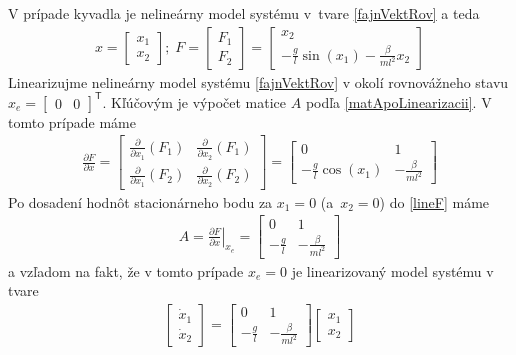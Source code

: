 \documentclass[a4paper, 10pt, ]{article}
\begin{document}
V prípade kyvadla je nelineárny model systému v~tvare \eqref{fajnVektRov} a teda
\begin{align}
	x=
	\begin{bmatrix}
		{x}_1 \\ {x}_2
	\end{bmatrix}
	;
	\;
	F=
	\begin{bmatrix}
		F_1 \\ F_2
	\end{bmatrix}
	=
	\begin{bmatrix}
		x_2 \\ - \frac{g}{l} \sin(x_1) - \frac{\beta}{ml^2} x_2
	\end{bmatrix}
\end{align}
Linearizujme nelineárny model systému \eqref{fajnVektRov} v okolí rovnovážneho stavu $x_e = \begin{bmatrix} 0 & 0 \end{bmatrix}^\mathsf{T}$. Kľúčovým je výpočet matice $A$ podľa \eqref{matApoLinearizacii}. V tomto prípade máme
\begin{align} \label{lineF}
	\frac{\partial F}{\partial x}
	=
	\begin{bmatrix}
		\displaystyle\frac{\partial}{\partial x_1} \left( F_1 \right) & \displaystyle\frac{\partial}{\partial x_2} \left( F_1 \right) \\
		\displaystyle\frac{\partial}{\partial x_1} \left( F_2 \right) & \displaystyle\frac{\partial}{\partial x_2} \left( F_2 \right)
	\end{bmatrix}
	=
	\begin{bmatrix}
		0 & 1 \\
		- \displaystyle\frac{g}{l} \cos(x_1) & - \displaystyle\frac{\beta}{ml^2}
	\end{bmatrix}
\end{align}
Po dosadení hodnôt stacionárneho bodu za $x_1 = 0$ (a~$x_2 = 0$) do \eqref{lineF} máme
\begin{align}
	A = \left. \frac{\partial F}{\partial x} \right|_{x_e}
	=
	\begin{bmatrix}
		0 & 1 \\
		- \displaystyle\frac{g}{l}  & - \displaystyle\frac{\beta}{ml^2}
	\end{bmatrix}
\end{align}
a vzľadom na fakt, že v tomto prípade $x_e = 0$ je linearizovaný model systému v tvare
\begin{align} \label{vyslednyLinearnyModel}
	\begin{bmatrix}
		\dot{x}_1 \\ \dot{x}_2
	\end{bmatrix}
	=
	\begin{bmatrix}
		0 & 1 \\
		- \displaystyle\frac{g}{l}  & - \displaystyle\frac{\beta}{ml^2}
	\end{bmatrix}
	\begin{bmatrix}
		{x}_1 \\ {x}_2
	\end{bmatrix}
\end{align}
\end{document}

